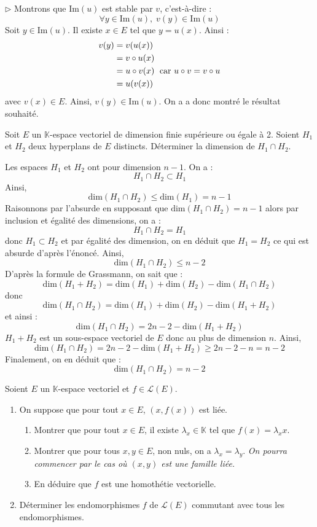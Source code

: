 \documentclass[a4paper,10pt]{report}
\begin{document}
\medskip

\noindent $\rhd$ Montrons que $\textrm{Im}(u)$ est stable par $v$, c'est-à-dire :
$$ \forall y \in \textrm{Im}(u), \; v(y) \in \textrm{Im}(u)$$
Soit $y \in \textrm{Im}(u)$. Il existe $x \in E$ tel que $y = u(x)$. Ainsi :
\begin{align*}
v(y) & = v (u(x)) \\
& = v \circ u(x) \\
& = u \circ v(x) \; \hbox{ car } u \circ v = v \circ u \\
& = u (v(x)) 
\end{align*}
avec $v(x) \in E$. Ainsi, $v(y) \in \textrm{Im}(u)$. On a a donc montré le résultat souhaité.


\begin{Exercice}{} Soit $E$ un $\mathbb{K}$-espace vectoriel de dimension finie supérieure ou égale à 2. Soient $H_1$ et $H_2$ deux hyperplans de $E$ distincts. Déterminer la dimension de $H_1 \cap H_2$.
\end{Exercice}

\corr Les espaces $H_1$ et $H_2$ ont pour dimension $n-1$. On a :
$$ H_1 \cap H_2 \subset H_1$$
Ainsi, 
$$ \textrm{dim}(H_1 \cap H_2) \leq  \textrm{dim}(H_1) = n-1$$
Raisonnons par l'absurde en supposant que $\textrm{dim}(H_1 \cap H_2) = n-1$ alors par inclusion et égalité des dimensions, on a :
$$ H_1 \cap H_2 = H_1$$
donc $H_1 \subset H_2$ et par égalité des dimension, on en déduit que $H_1 = H_2$ ce qui est absurde d'après l'énoncé. Ainsi,
$$  \textrm{dim}(H_1 \cap H_2) \leq n-2$$
D'après la formule de Grassmann, on sait que :
$$  \textrm{dim}(H_1 + H_2) =  \textrm{dim}(H_1)  +  \textrm{dim}(H_2) -  \textrm{dim}(H_1 \cap H_2) $$
donc 
$$  \textrm{dim}(H_1 \cap H_2) =  \textrm{dim}(H_1)  +  \textrm{dim}(H_2) -  \textrm{dim}(H_1 + H_2) $$
et ainsi :
$$\textrm{dim}(H_1 \cap H_2) =  2n-2 -  \textrm{dim}(H_1 + H_2) $$
$H_1+H_2$ est un sous-espace vectoriel de $E$ donc au plus de dimension $n$. Ainsi,
$$\textrm{dim}(H_1 \cap H_2) =  2n-2 -  \textrm{dim}(H_1 + H_2) \geq 2n-2-n = n-2$$
Finalement, on en déduit que :
$$ \textrm{dim}(H_1 \cap H_2) =  n-2 $$


\begin{Exercice}{} Soient $E$ un $\mathbb{K}$-espace vectoriel et $f \in \mathcal{L}(E)$.

\begin{enumerate}
\item On suppose que pour tout $x \in E$, $(x, f(x))$ est liée.
\begin{enumerate}
\item Montrer que pour tout $x \in E$, il existe $\lambda_x \in \mathbb{K}$ tel que $f(x)= \lambda_x x$.
\item Montrer que pour tous $x,y \in E$, non nuls, on a $\lambda_x = \lambda_y$. \textit{On pourra commencer par le cas où $(x,y)$ est une famille liée.}
\item En déduire que $f$ est une homothétie vectorielle.
\end{enumerate}
\item Déterminer les endomorphismes $f$ de $\mathcal{L}(E)$ commutant avec tous les endomorphismes.
\end{enumerate}
\end{Exercice} 
\end{document}

